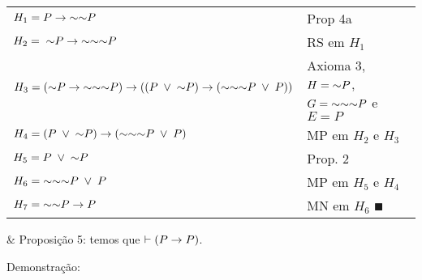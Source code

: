 \begin{tabular}{p{}p{}}
  \hline
    $H_1 = P \rightarrow \mathord{\sim}\mathord{\sim} P$                                  & Prop 4a \\
    $H_2 = \;\mathord{\sim} P \rightarrow \mathord{\sim}\mathord{\sim}\mathord{\sim} P$                       & RS em $H_1$ \\
    $H_3 = (\mathord{\sim} P \rightarrow \mathord{\sim}\mathord{\sim}\mathord{\sim} P) \rightarrow ( (P \;\lor\; \mathord{\sim} P) \rightarrow (\mathord{\sim}\mathord{\sim}\mathord{\sim} P \;\lor\; P) )$       & Axioma 3, $H = \mathord{\sim} P$, $G = \mathord{\sim}\mathord{\sim}\mathord{\sim} P$ e $E = P$ \\
    $H_4 = (P \;\lor\; \mathord{\sim} P) \rightarrow (\mathord{\sim}\mathord{\sim}\mathord{\sim} P \;\lor\; P)$         & MP em $H_2$ e $H_3$ \\
    $H_5 = P \;\lor\; \mathord{\sim} P$                                       & Prop. 2 \\
    $H_6 = \mathord{\sim}\mathord{\sim}\mathord{\sim} P \;\lor\; P$                               & MP em $H_5$ e $H_4$ \\
    $H_7 = \mathord{\sim}\mathord{\sim} P \rightarrow P$                                  & MN em $H_6$ $\QED$ \\
  \hline
\end{tabular}

\SKIP
  
\begin{easylist}

  & Proposição 5: temos que $\vdash (P \rightarrow P)$.

\end{easylist}

\SKIP

Demonstração:

